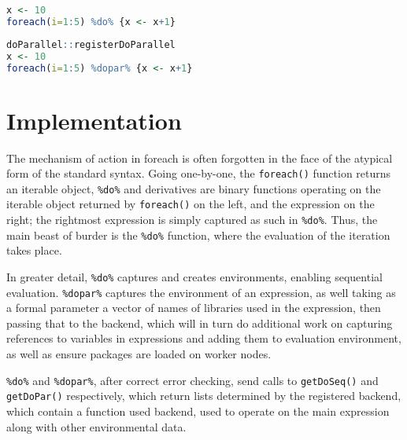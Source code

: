 \documentclass[a4paper,10pt]{article}
\begin{document}
\begin{lstlisting}[float,language=R,caption={Serial Iteration},label=lst:serial]
x <- 10
foreach(i=1:5) %do% {x <- x+1}
\end{lstlisting}
\begin{lstlisting}[float,language=R,caption={Parallel Iteration},label=lst:parallel]
doParallel::registerDoParallel
x <- 10
foreach(i=1:5) %dopar% {x <- x+1}
\end{lstlisting}

\section{Implementation}
\label{sec:implementation}

The mechanism of action in foreach is often forgotten in the face of
the atypical form of the standard syntax. Going one-by-one, the
\texttt{foreach()} function returns an iterable object,
\texttt{\%do\%} and derivatives are binary functions operating on the
iterable object returned by \texttt{foreach()} on the left, and the
expression on the right; the rightmost expression is simply captured
as such in \texttt{\%do\%}. Thus, the main beast of burder is the
\texttt{\%do\%} function, where the evaluation of the iteration takes
place.

In greater detail, \texttt{\%do\%} captures and creates environments, enabling
sequential evaluation. \texttt{\%dopar\%} captures the environment of an
expression, as well taking as a formal parameter a vector of names of libraries
used in the expression, then passing that to the backend, which will in turn do
additional work on capturing references to variables in expressions and adding
them to evaluation environment, as well as ensure packages are loaded on worker
nodes. 

\texttt{\%do\%} and \texttt{\%dopar\%}, after correct error checking,
send calls to \texttt{getDoSeq()} and \texttt{getDoPar()}
respectively, which return lists determined by the registered backend,
which contain a function used backend, used to operate on the main
expression along with other environmental data.
\end{document}
